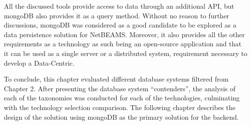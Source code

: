 All the discussed tools provide access to data through an additional API, but
mongoDB also provides it as a query method. Without no reason to further
discussions, mongoDB was considered as a good candidate to be explored as a
data persistence solution for NetBEAMS. Moreover, it also provides all the
other requirements as a technology as such being an open-source application and
that it can be used as a single server or a distributed system, requirement
necessary to develop a Data-Centric.

To conclude, this chapter evaluated different database systems filtered
from Chapter 2. After presenting the database system ``contenders'', the
analysis of each of the taxonomies was conducted for each of the technologies,
culminating with the technology selection comparison. The following chapter
describes the design of the solution using mongoDB as the primary solution for
the backend.
